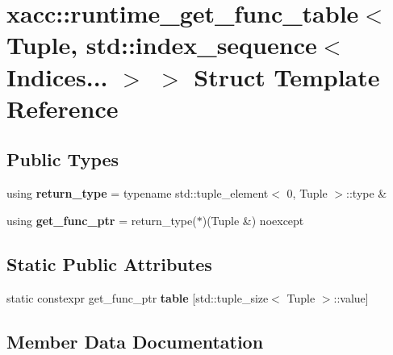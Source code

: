 \hypertarget{a00254}{}\section{xacc\+:\+:runtime\+\_\+get\+\_\+func\+\_\+table$<$ Tuple, std\+:\+:index\+\_\+sequence$<$ Indices... $>$ $>$ Struct Template Reference}
\label{a00254}
\subsection*{Public Types}
\begin{DoxyCompactItemize}
\item 
using {\bfseries return\+\_\+type} = typename std\+::tuple\+\_\+element$<$ 0, Tuple $>$\+::type \&\hypertarget{a00254_a1d2e9cd7910527e3c4f0162500f067a7}{}\label{a00254_a1d2e9cd7910527e3c4f0162500f067a7}

\item 
using {\bfseries get\+\_\+func\+\_\+ptr} = return\+\_\+type($\ast$)(Tuple \&) noexcept\hypertarget{a00254_afba5cf89694dc07b12aaabf6388a4427}{}\label{a00254_afba5cf89694dc07b12aaabf6388a4427}

\end{DoxyCompactItemize}
\subsection*{Static Public Attributes}
\begin{DoxyCompactItemize}
\item 
static constexpr get\+\_\+func\+\_\+ptr {\bfseries table} \mbox{[}std\+::tuple\+\_\+size$<$ Tuple $>$\+::value\mbox{]}
\end{DoxyCompactItemize}


\subsection{Member Data Documentation}
